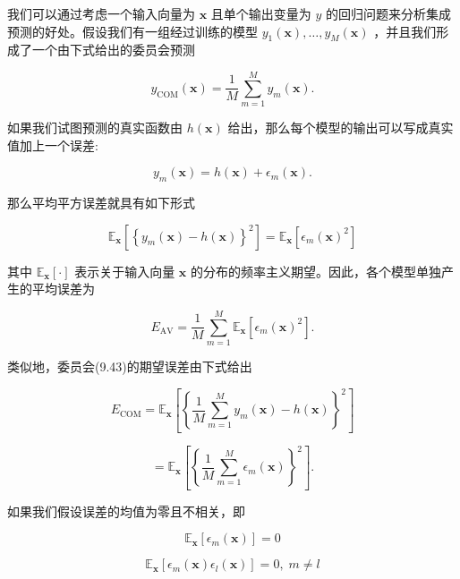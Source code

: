 \documentclass[10pt]{article}
\begin{document}
我们可以通过考虑一个输入向量为 \(\mathbf{x}\) 且单个输出变量为 \(y\) 的回归问题来分析集成预测的好处。假设我们有一组经过训练的模型 \({y}_{1}\left( \mathbf{x}\right) ,\ldots ,{y}_{M}\left( \mathbf{x}\right)\) ，并且我们形成了一个由下式给出的委员会预测

\[
{y}_{\mathrm{{COM}}}\left( \mathbf{x}\right)  = \frac{1}{M}\mathop{\sum }\limits_{{m = 1}}^{M}{y}_{m}\left( \mathbf{x}\right) . \tag{9.43}
\]

如果我们试图预测的真实函数由 \(h\left( \mathbf{x}\right)\) 给出，那么每个模型的输出可以写成真实值加上一个误差:

\[
{y}_{m}\left( \mathbf{x}\right)  = h\left( \mathbf{x}\right)  + {\epsilon }_{m}\left( \mathbf{x}\right) . \tag{9.44}
\]

那么平均平方误差就具有如下形式

\[
{\mathbb{E}}_{\mathbf{x}}\left\lbrack  {\left\{  {y}_{m}\left( \mathbf{x}\right)  - h\left( \mathbf{x}\right) \right\}  }^{2}\right\rbrack   = {\mathbb{E}}_{\mathbf{x}}\left\lbrack  {{\epsilon }_{m}{\left( \mathbf{x}\right) }^{2}}\right\rbrack   \tag{9.45}
\]

其中 \({\mathbb{E}}_{\mathbf{x}}\left\lbrack  \cdot \right\rbrack\) 表示关于输入向量 \(\mathbf{x}\) 的分布的频率主义期望。因此，各个模型单独产生的平均误差为

\[
{E}_{\mathrm{{AV}}} = \frac{1}{M}\mathop{\sum }\limits_{{m = 1}}^{M}{\mathbb{E}}_{\mathbf{x}}\left\lbrack  {{\epsilon }_{m}{\left( \mathbf{x}\right) }^{2}}\right\rbrack  . \tag{9.46}
\]

类似地，委员会(9.43)的期望误差由下式给出

\[
{E}_{\mathrm{{COM}}} = {\mathbb{E}}_{\mathbf{x}}\left\lbrack  {\left\{  \frac{1}{M}\mathop{\sum }\limits_{{m = 1}}^{M}{y}_{m}\left( \mathbf{x}\right)  - h\left( \mathbf{x}\right) \right\}  }^{2}\right\rbrack
\]

\[
= {\mathbb{E}}_{\mathbf{x}}\left\lbrack  {\left\{  \frac{1}{M}\mathop{\sum }\limits_{{m = 1}}^{M}{\epsilon }_{m}\left( \mathbf{x}\right) \right\}  }^{2}\right\rbrack  . \tag{9.47}
\]

如果我们假设误差的均值为零且不相关，即

\[
{\mathbb{E}}_{\mathbf{x}}\left\lbrack  {{\epsilon }_{m}\left( \mathbf{x}\right) }\right\rbrack   = 0 \tag{9.48}
\]

\[
{\mathbb{E}}_{\mathbf{x}}\left\lbrack  {{\epsilon }_{m}\left( \mathbf{x}\right) {\epsilon }_{l}\left( \mathbf{x}\right) }\right\rbrack   = 0,\;m \neq  l \tag{9.49}
\]
\end{document}
